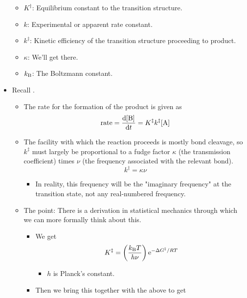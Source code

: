 \documentclass[../notes.tex]{subfiles}
\begin{document}
\begin{itemize}
\begin{itemize}
        \item $K^\ddagger$: Equilibrium constant to the transition structure.
        \item $k$: Experimental or apparent rate constant.
        \item $k^\ddagger$: Kinetic efficiency of the transition structure proceeding to product.
        \item $\kappa$: We'll get there.
        \item $\kB$: The Boltzmann constant.
    \end{itemize}
    \pagebreak
    \item Recall .
    \begin{itemize}
        \item The rate for the formation of the product is given as
        \begin{equation*}
            \text{rate} = \dv{\cnc{B}}{t} = K^\ddagger k^\ddagger\cnc{A}
        \end{equation*}
        \item The facility with which the reaction proceeds is mostly  bond cleavage, so $k^\ddagger$ must largely be proportional to a fudge factor $\kappa$ (the transmission coefficient) times $\nu$ (the frequency associated with the relevant bond).
        \begin{equation*}
            k^\ddagger = \kappa\nu
        \end{equation*}
        \begin{itemize}
            \item In reality, this frequency will be the "imaginary frequency" at the transition state, not any real-numbered frequency.
        \end{itemize}
        \item The point: There is a derivation in statistical mechanics through which we can more formally think about this.
        \begin{itemize}
            \item We get
            \begin{equation*}
                K^\ddagger = \left( \frac{\kB T}{h\nu} \right)\e[-\Delta G^\ddagger/RT]
            \end{equation*}
            \begin{itemize}
                \item $h$ is Planck's constant.
            \end{itemize}
            \item Then we bring this together with the above to get

\end{itemize}
\end{itemize}
\end{itemize}
\end{document}
